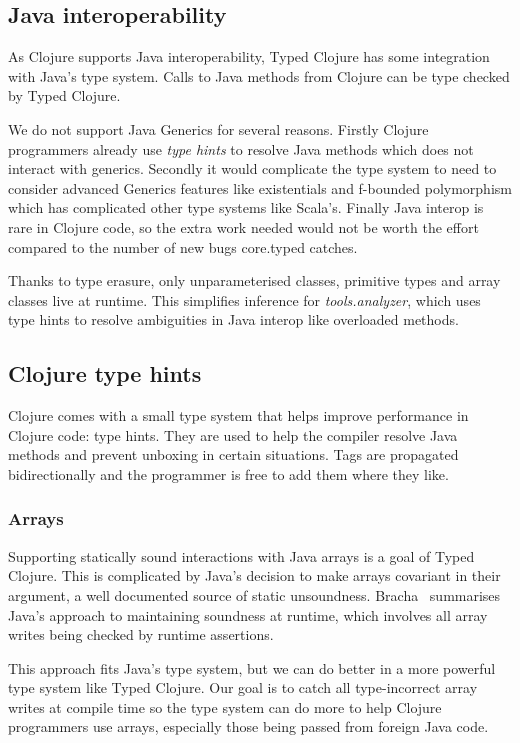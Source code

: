 \documentclass[preprint,10pt]{sigplanconf}
\begin{document}
\subsection{Java interoperability}

As Clojure supports Java interoperability, Typed Clojure has some
integration with Java's type system. Calls to Java methods from
Clojure can be type checked by Typed Clojure.

We do not support Java Generics for several reasons. Firstly
Clojure programmers already use \emph{type hints} to resolve
Java methods which does not interact with generics. Secondly
it would complicate the type system to need to consider advanced
Generics features like existentials and f-bounded polymorphism
which has complicated other type systems like Scala's.
Finally Java interop is rare in Clojure code, so the extra
work needed would not be worth the effort compared to the number
of new bugs core.typed catches.

Thanks to type erasure, only unparameterised classes, primitive
types and array classes live at runtime. This simplifies 
inference for \emph{tools.analyzer}, which uses type hints
to resolve ambiguities in Java interop like overloaded methods.

\subsection{Clojure type hints}

Clojure comes with a small type system that helps improve
performance in Clojure code: type hints. They are used to help
the compiler resolve Java methods and prevent unboxing in
certain situations. Tags are propagated bidirectionally
and the programmer is free to add them where they like.

\subsubsection{Arrays}
\label{sec:arrays}

Supporting statically sound interactions with Java arrays is a goal
of Typed Clojure. This is complicated by Java's decision to make
arrays covariant in their argument, a well documented source of static
unsoundness. Bracha~\cite{Bra98} summarises Java's approach to maintaining
soundness at runtime, which involves all array writes being checked by
runtime assertions.

This approach fits Java's type system, but we can do better in a more powerful
type system like Typed Clojure. Our goal is to catch all type-incorrect array
writes at compile time so the type system can do more to help Clojure programmers
use arrays, especially those being passed from foreign Java code.
\end{document}
